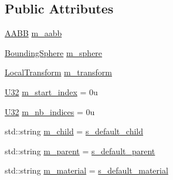 \subsection*{Public Attributes}
\begin{DoxyCompactItemize}
\item 
\mbox{\hyperlink{classmage_1_1_a_a_b_b}{A\+A\+BB}} \mbox{\hyperlink{structmage_1_1rendering_1_1_model_part_a69f7f90a31e48a286fecebc9e680b5ef}{m\+\_\+aabb}}
\item 
\mbox{\hyperlink{classmage_1_1_bounding_sphere}{Bounding\+Sphere}} \mbox{\hyperlink{structmage_1_1rendering_1_1_model_part_aa2204e02fe90f993990cdda677bff6e7}{m\+\_\+sphere}}
\item 
\mbox{\hyperlink{classmage_1_1_local_transform}{Local\+Transform}} \mbox{\hyperlink{structmage_1_1rendering_1_1_model_part_af34853cb09b179bd8ffb0da151914066}{m\+\_\+transform}}
\item 
\mbox{\hyperlink{namespacemage_aa5d6eaabaac3cdd01873d6a3d27e90f3}{U32}} \mbox{\hyperlink{structmage_1_1rendering_1_1_model_part_a251d19417a0b4abe98faeae767b9fef4}{m\+\_\+start\+\_\+index}} = 0u
\item 
\mbox{\hyperlink{namespacemage_aa5d6eaabaac3cdd01873d6a3d27e90f3}{U32}} \mbox{\hyperlink{structmage_1_1rendering_1_1_model_part_a6e622f4bcb1ada388c3ee489c22e4547}{m\+\_\+nb\+\_\+indices}} = 0u
\item 
std\+::string \mbox{\hyperlink{structmage_1_1rendering_1_1_model_part_ad62194df918560d18de5e311b26eabfc}{m\+\_\+child}} = \mbox{\hyperlink{structmage_1_1rendering_1_1_model_part_a3571b142c7948d7ab5af699799c69b42}{s\+\_\+default\+\_\+child}}
\item 
std\+::string \mbox{\hyperlink{structmage_1_1rendering_1_1_model_part_ac2e8e1a53ded91cf4e0439c15b63ab07}{m\+\_\+parent}} = \mbox{\hyperlink{structmage_1_1rendering_1_1_model_part_ab6747ba3fd20c9f55f1d9bb7a64033e5}{s\+\_\+default\+\_\+parent}}
\item 
std\+::string \mbox{\hyperlink{structmage_1_1rendering_1_1_model_part_abe5c6a98f2c039f2a20e9f6d1842f71b}{m\+\_\+material}} = \mbox{\hyperlink{structmage_1_1rendering_1_1_model_part_a833762db3fb81dd2086e9b89da158b12}{s\+\_\+default\+\_\+material}}
\end{DoxyCompactItemize}
